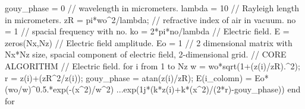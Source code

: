 \documentclass[a4paper]{article}
\begin{document}
{		gouy\_phase = 0 \newline		
		\textcolor{OliveGreen}{// wavelength in micrometers.}\newline
		lambda = 10\newline
		\textcolor{OliveGreen}{// Rayleigh length in micrometers.}\newline
		zR = pi*wo\string^2/lambda;\newline
		\textcolor{OliveGreen}{// refractive index of air in vacuum.}\newline
		no = 1\newline
		\textcolor{OliveGreen}{// spacial frequency with no.}\newline
		ko = 2*pi*no/lambda\newline
		\textcolor{OliveGreen}{// Electric field.}\newline
		E = zeros(Nx,Nz)\newline
		\textcolor{OliveGreen}{// Electric field amplitude.}\newline
		Eo = 1\newline
		\textcolor{OliveGreen}{// 2 dimensional matrix with Nx*Nz size, spacial component of electric field, 2-dimensional grid.}\newpage
		\noindent\textcolor{OliveGreen}{// CORE ALGORITHM}\newline\newline
		\textcolor{OliveGreen}{// Electric field.}\newline
		for i from 1 to Nz \newline
		\indent w = wo*sqrt(1+(z(i)/zR).\string^2);\newline
		\indent r = z(i)+(zR\string^2/z(i));\newline
		\indent gouy\_phase = atan(z(i)/zR);\newline
		\indent E(i\_colomn) = Eo*(wo/w)\string^0.5.*exp(-(x\string^2)/w\string^2) ...\newline \indent\indent\indent\indent\indent\indent\indent\indent*exp(1j*(k*z(i)+k*(x\string^2)/(2*r)-gouy\_phase))\newline
		end for\newline\newline	
	}\newpage
	
\end{document}
